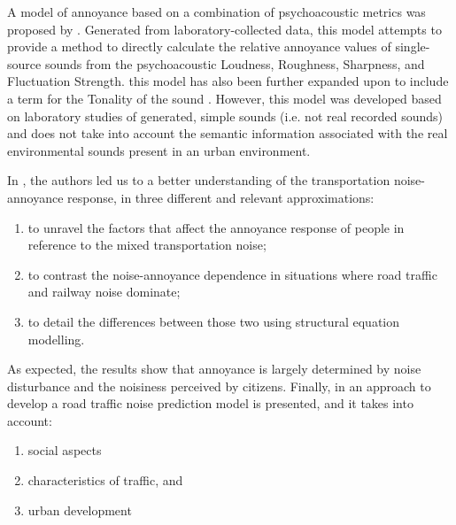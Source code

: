 
   A model of annoyance based on a combination of psychoacoustic metrics was proposed by \citet{PsychoacousticsfactsmodelsZwicker}. Generated from laboratory-collected data, this model attempts to provide a method to directly calculate the relative annoyance values of single-source sounds from the psychoacoustic Loudness, Roughness, Sharpness, and Fluctuation Strength. this model has also been further expanded upon to include a term for the Tonality of the sound . However, this model was developed based on laboratory studies of generated, simple sounds (i.e. not real recorded sounds) and does not take into account the semantic information associated with the real environmental sounds present in an urban environment.

   In , the authors led us to a better understanding of the transportation noise-annoyance response, in three different and relevant approximations:

   \begin{enumerate}
     \item to unravel the factors that affect the annoyance response of people in reference to the mixed transportation noise;
     \item to contrast the noise-annoyance dependence in situations where road traffic and railway noise dominate;
     \item to detail the differences between those two using structural equation modelling.
   \end{enumerate}

   As expected, the results show that annoyance is largely determined by noise disturbance and the noisiness perceived by citizens. Finally, in  an approach to develop a road traffic noise prediction model is presented, and it takes into account:

   \begin{enumerate}
     \item social aspects
     \item characteristics of traffic, and
     \item urban development
   \end{enumerate}

